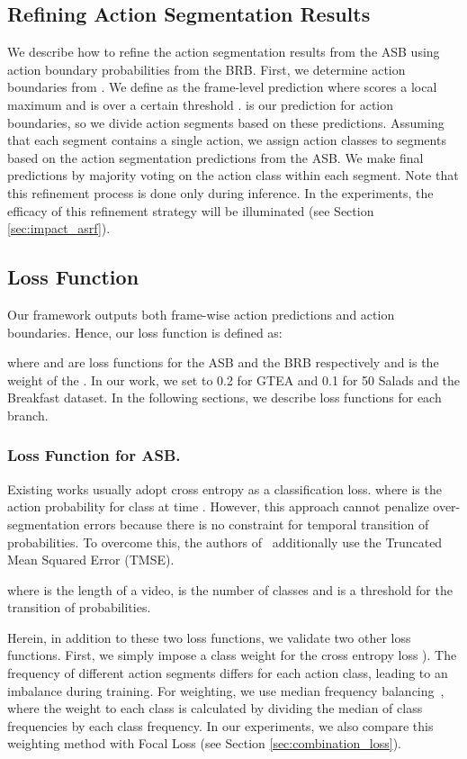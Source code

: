 \documentclass[10pt,twocolumn,letterpaper]{article}
\begin{document}
\subsection{Refining Action Segmentation Results}
\label{sec:refine}
We describe how to refine the action segmentation results  from the ASB using action boundary probabilities  from the BRB.
First, we determine action boundaries  from .
We define  as the frame-level prediction where  scores a local maximum and is over a certain threshold .
 is our prediction for action boundaries, so we divide action segments based on these predictions.
Assuming that each segment contains a single action, 
we assign action classes to segments based on the action segmentation predictions from the ASB.
We make final predictions by majority voting on the action class within each segment.
Note that this refinement process is done only during inference.
In the experiments, the efficacy of this refinement strategy will be illuminated (see Section \ref{sec:impact_asrf}).


\subsection{Loss Function}
\label{sec:loss}
Our framework outputs both frame-wise action predictions and action boundaries.
Hence, our loss function is defined as:

where  and  are loss functions for the ASB and the BRB respectively
and  is the weight of the .
In our work, we set  to 0.2 for GTEA and 0.1 for 50 Salads and the Breakfast dataset.
In the following sections, we describe loss functions for each branch. 

\subsubsection{Loss Function for ASB.}
\label{sec:loss_asb}
Existing works usually adopt cross entropy as a classification loss.
 \noindent
where  is the action probability for class  at time .
However, this approach cannot penalize over-segmentation errors because there is no constraint for temporal transition of probabilities. To overcome this, the authors of~\cite{mstcn} additionally use the Truncated Mean Squared Error (TMSE).

\noindent
where  is the length of a video,  is the number of classes and  is a threshold for the transition of probabilities.

Herein, in addition to these two loss functions, we validate two other loss functions.
First, we simply impose a class weight for the cross entropy loss ).
The frequency of different action segments differs for each action class, leading to an imbalance during training.
For weighting, we use median frequency balancing~\cite{median},
where the weight to each class is calculated by dividing the median of class frequencies by each class frequency.
In our experiments, we also compare this weighting method with Focal Loss \cite{focal} (see Section \ref{sec:combination_loss}).
\end{document}
